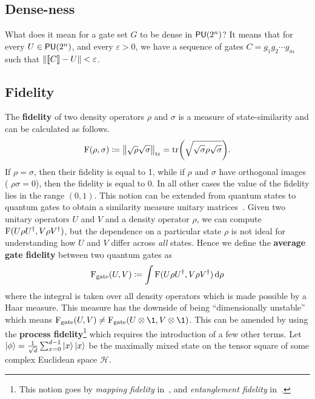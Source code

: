 \subsection{Dense-ness}

What does it mean for a gate set $G$ to be dense in $\mathsf{PU} (2^n)$?
It means that for every $U \in \mathsf{PU} (2^n)$, and every $\varepsilon > 0$, we have a sequence of gates $C = g_1g_2\cdots g_m$ such that $\norm{\llbracket C\rrbracket - U} < \varepsilon$.

\subsection{Fidelity}

The \textbf{fidelity} of two density operators $\rho$ and $\sigma$ is a measure of state-similarity and can be calculated as follows.
\begin{equation}
    \operatorname{F}(\rho, \sigma) \coloneqq \norm{\sqrt{\rho}\sqrt{\sigma}}_\text{tr} = \tr(\sqrt{\sqrt{\sigma}\rho\sqrt{\sigma}}).
\end{equation}
If $\rho = \sigma$, then their fidelity is equal to 1, while if $\rho$ and $\sigma$ have orthogonal images (\ie{} $\rho\sigma = 0$), then the fidelity is equal to 0.
In all other cases the value of the fidelity lies in the range $(0, 1)$.
This notion can be extended from quantum states to quantum gates to obtain a
similarity measure unitary matrices~\cite{fidelity}.
Given two unitary operators $U$ and $V$ and a density operator $\rho$, we can compute $\operatorname{F}(U\rho U^\dagger, V\rho V^\dagger)$, but the dependence on a particular state $\rho$ is not ideal for understanding how $U$ and $V$ differ across \emph{all} states.
Hence we define the \textbf{average gate fidelity} between two quantum gates as
\begin{equation}
    \operatorname{F}_\text{gate}(U, V) \coloneqq \int \operatorname{F}(U\rho U^\dagger, V\rho V^\dagger)\dd{\rho}
\end{equation}
where the integral is taken over all density operators which is made possible by a Haar measure.
This measure has the downside of being ``dimensionally unstable'' which means $\Fid_\text{gate}(U, V) \neq \Fid_\text{gate}(U\otimes \1, V\otimes \1)$.
This can be amended by using the \textbf{process fidelity}\footnote{This notion goes by \emph{mapping fidelity} in~\cite{watroustqi}, and \emph{entanglement fidelity} in~\cite{nielsenchuang}.} which requires the introduction of a few other terms.
Let $\ket{\phi} = \frac{1}{\sqrt{d}}\sum_{x = 0}^{d-1}\ket{x}\ket{x}$ be the maximally mixed state on the tensor square of some complex Euclidean space $\mathcal{H}$.
